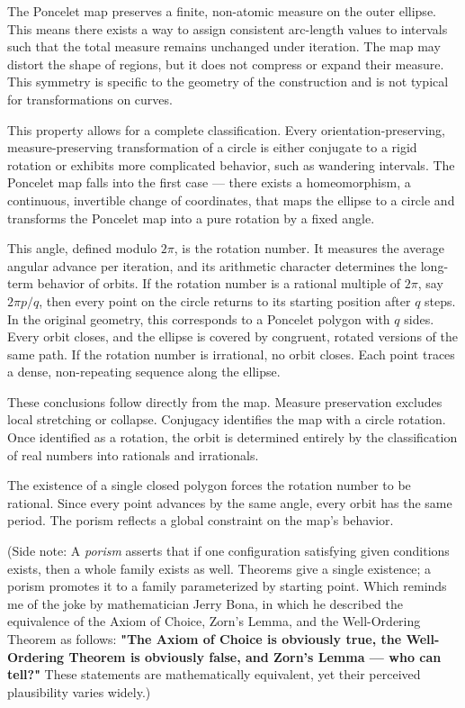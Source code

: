 The Poncelet map preserves a finite, non-atomic measure on the outer ellipse. This means there exists a way to assign consistent arc-length values to intervals such that the total measure remains unchanged under iteration. The map may distort the shape of regions, but it does not compress or expand their measure. This symmetry is specific to the geometry of the construction and is not typical for transformations on curves.

This property allows for a complete classification. Every orientation-preserving, measure-preserving transformation of a circle is either conjugate to a rigid rotation or exhibits more complicated behavior, such as wandering intervals. The Poncelet map falls into the first case — there exists a homeomorphism, a continuous, invertible change of coordinates, that maps the ellipse to a circle and transforms the Poncelet map into a pure rotation by a fixed angle.

This angle, defined modulo $2\pi$, is the rotation number. It measures the average angular advance per iteration, and its arithmetic character determines the long-term behavior of orbits. If the rotation number is a rational multiple of $2\pi$, say $2\pi p/q$, then every point on the circle returns to its starting position after $q$ steps. In the original geometry, this corresponds to a Poncelet polygon with $q$ sides. Every orbit closes, and the ellipse is covered by congruent, rotated versions of the same path. If the rotation number is irrational, no orbit closes. Each point traces a dense, non-repeating sequence along the ellipse.

These conclusions follow directly from the map. Measure preservation excludes local stretching or collapse. Conjugacy identifies the map with a circle rotation. Once identified as a rotation, the orbit is determined entirely by the classification of real numbers into rationals and irrationals.

The existence of a single closed polygon forces the rotation number to be rational. Since every point advances by the same angle, every orbit has the same period. The porism reflects a global constraint on the map's behavior.

(Side note: A \emph{porism} asserts that if one configuration satisfying given conditions exists, then a whole family exists as well. Theorems give a single existence; a porism promotes it to a family parameterized by starting point. Which reminds me of the joke by mathematician Jerry Bona, in which he described the equivalence of the Axiom of Choice, Zorn’s Lemma, and the Well-Ordering Theorem as follows: \textbf{"The Axiom of Choice is obviously true, the Well-Ordering Theorem is obviously false, and Zorn’s Lemma — who can tell?"} These statements are mathematically equivalent, yet their perceived plausibility varies widely.)

